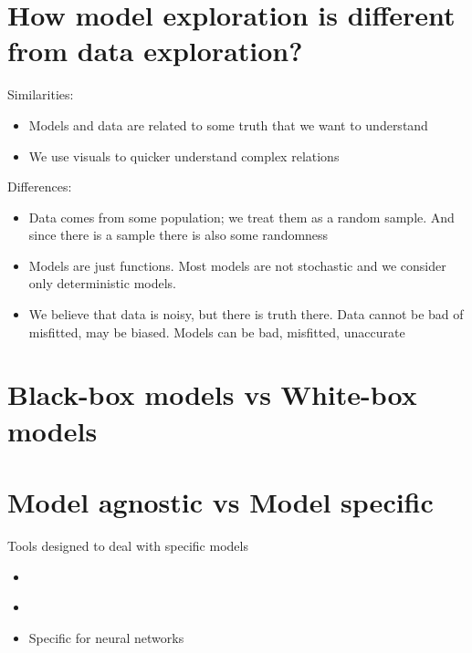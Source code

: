 \documentclass[]{book}
\providecommand{\tightlist}{%
  \setlength{\itemsep}{0pt}\setlength{\parskip}{0pt}}
\theoremstyle{definition}
\theoremstyle{definition}
\theoremstyle{definition}
\theoremstyle{remark}
\begin{document}
\hypertarget{how-model-exploration-is-different-from-data-exploration}{%
\section{How model exploration is different from data
exploration?}\label{how-model-exploration-is-different-from-data-exploration}}

Similarities:

\begin{itemize}
\tightlist
\item
  Models and data are related to some truth that we want to understand
\item
  We use visuals to quicker understand complex relations
\end{itemize}

Differences:

\begin{itemize}
\tightlist
\item
  Data comes from some population; we treat them as a random sample. And
  since there is a sample there is also some randomness
\item
  Models are just functions. Most models are not stochastic and we
  consider only deterministic models.
\item
  We believe that data is noisy, but there is truth there. Data cannot
  be bad of misfitted, may be biased. Models can be bad, misfitted,
  unaccurate
\end{itemize}

\hypertarget{black-box-models-vs-white-box-models}{%
\section{Black-box models vs White-box
models}\label{black-box-models-vs-white-box-models}}

\citep{R-DALEX}

\hypertarget{model-agnostic-vs-model-specific}{%
\section{Model agnostic vs Model
specific}\label{model-agnostic-vs-model-specific}}

Tools designed to deal with specific models

\begin{itemize}
\tightlist
\item
  \citep{R-randomForestExplainer}
\item
  \citep{R-xgboostExplainer}
\item
  Specific for neural networks
\end{itemize}
\end{document}
